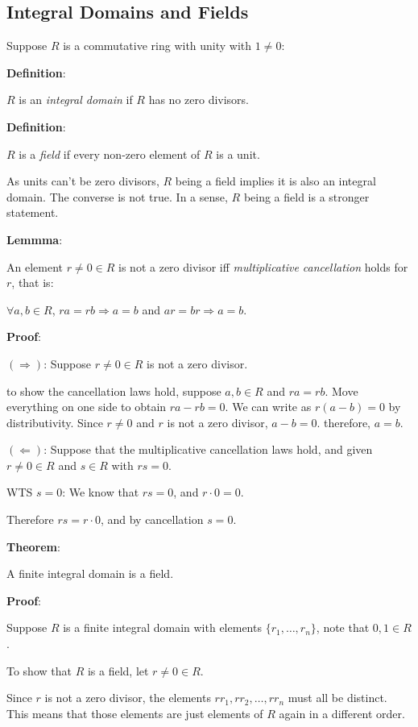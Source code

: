 \documentclass{article}
\begin{document}
\begin{multicols*}{2}
\section{Integral Domains and Fields}

Suppose $R$ is a commutative ring with unity with $1 \neq 0$:

\textbf{Definition}:

$R$ is an \textit{integral domain} if $R$ has no zero divisors.

\textbf{Definition}:

$R$ is a \textit{field} if every non-zero element of $R$ is a unit.

As units can't be zero divisors, $R$ being a field implies it is also an integral domain. The converse is not true. In a sense, $R$ being a field is a stronger statement.

\textbf{Lemmma}:

An element $r \neq 0 \in R$ is not a zero divisor iff \textit{multiplicative cancellation} holds for $r$, that is:

$\forall a, b \in R$, $ra = rb \Rightarrow a=b$ and $ar=br \Rightarrow a = b$.

\textbf{Proof}:

$(\Rightarrow)$: Suppose $r\neq0 \in R$ is not a zero divisor.

to show the cancellation laws hold, suppose $a, b \in R$ and $ra=rb$. Move everything on one side to obtain $ra-rb=0$. We can write as $r(a-b)=0$ by distributivity. Since $r \neq 0$ and $r$ is not a zero divisor, $a-b = 0$. therefore, $a = b$.

$(\Leftarrow)$: Suppose that the multiplicative cancellation laws hold, and given $r \neq 0 \in R$ and $s\in R$ with $rs = 0$. 

WTS $s = 0$: We know that $rs = 0$, and $r \cdot 0 = 0$. 

Therefore $rs = r \cdot 0$, and by cancellation $s = 0$.

\textbf{Theorem}:

A finite integral domain is a field.

\textbf{Proof}:

Suppose $R$ is a finite integral domain with elements $\{r_1,\dots, r_n\}$, note that $0,1 \in R$. 

To show that $R$ is a field, let $r \neq 0 \in R$.

Since $r$ is not a zero divisor, the elements $rr_1, rr_2, \dots, rr_n$ must all be distinct. This means that those elements are just elements of $R$ again in a different order.


\end{multicols*}
\end{document}
